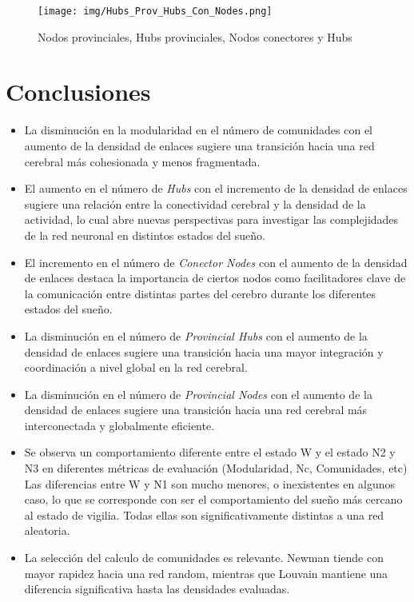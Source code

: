\documentclass{article}
\begin{document}
\begin{figure}[H]
    \centering
    {\texttt{[image: img/Hubs\_Prov\_Hubs\_Con\_Nodes.png]}}
    \caption[]{Nodos provinciales, Hubs provinciales, Nodos conectores y Hubs \footnotemark}
    \label{fig:hubs_prov_hubs_con_nodes}
\end{figure}

\section{Conclusiones}
\label{others}

\begin{itemize}
\item La disminución en la modularidad en el número de comunidades con el aumento de la densidad de enlaces sugiere una transición hacia una red cerebral más cohesionada y menos fragmentada.
\item El aumento en el número de \textit{Hubs} con el incremento de la densidad de enlaces sugiere una relación entre la conectividad cerebral y la densidad de la actividad, lo cual abre nuevas perspectivas para investigar las complejidades de la red neuronal en distintos estados del sueño.
\item El incremento en el número de \textit{Conector Nodes} con el aumento de la densidad de enlaces destaca la importancia de ciertos nodos como facilitadores clave de la comunicación entre distintas partes del cerebro durante los diferentes estados del sueño.
\item La disminución en el número de \textit{Provincial Hubs} con el aumento de la densidad de enlaces sugiere una transición hacia una mayor integración y coordinación a nivel global en la red cerebral.
\item La disminución en el número de \textit{Provincial Nodes} con el aumento de la densidad de enlaces sugiere una transición hacia una red cerebral más interconectada y globalmente eficiente.
\item Se observa un comportamiento diferente entre el estado W y el estado N2 y N3 en diferentes métricas de evaluación (Modularidad, Nc, Comunidades, etc) Las diferencias entre W y N1 son mucho menores, o inexistentes en algunos caso, lo que se corresponde con ser el comportamiento del sueño más cercano al estado de vigilia. Todas ellas son significativamente distintas a una red aleatoria.
\item La selección del calculo de comunidades es relevante. Newman tiende con mayor rapidez hacia una red random, mientras que Louvain mantiene una diferencia significativa hasta las densidades evaluadas.

\end{itemize}

\medskip

{
\small


}
\end{document}
